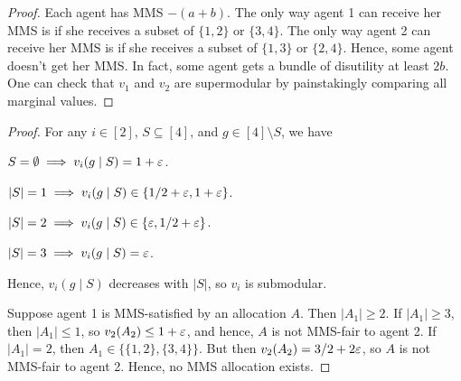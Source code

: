 \begin{proof}
Each agent has MMS $-(a+b)$.
The only way agent 1 can receive her MMS is if she receives a subset of $\{1, 2\}$ or $\{3, 4\}$.
The only way agent 2 can receive her MMS is if she receives a subset of $\{1, 3\}$ or $\{2, 4\}$.
Hence, some agent doesn't get her MMS. In fact, some agent gets a bundle of disutility at least $2b$.
One can check that $v_1$ and $v_2$ are supermodular by painstakingly comparing all marginal values.
\end{proof}

\begin{proof}
For any $i \in [2]$, $S \subseteq [4]$, and $g \in [4] \setminus S$, we have
\begin{tightenum}
\item $S = \emptyset \implies v_i(g \mid S) = 1 + \varepsilon$.
\item $|S| = 1 \implies v_i(g \mid S) \in \{1/2 + \varepsilon, 1 + \varepsilon\}$.
\item $|S| = 2 \implies v_i(g \mid S) \in \{\varepsilon, 1/2 + \varepsilon\}$.
\item $|S| = 3 \implies v_i(g \mid S) = \varepsilon$.
\end{tightenum}
Hence, $v_i(g \mid S)$ decreases with $|S|$, so $v_i$ is submodular.

Suppose agent 1 is MMS-satisfied by an allocation $A$. Then $|A_1| \ge 2$.
If $|A_1| \ge 3$, then $|A_1| \le 1$, so $v_2(A_2) \le 1 + \varepsilon$,
and hence, $A$ is not MMS-fair to agent 2.
If $|A_1| = 2$, then $A_1 \in \{\{1, 2\}, \{3, 4\}\}$.
But then $v_2(A_2) = 3/2 + 2\varepsilon$, so $A$ is not MMS-fair to agent 2.
Hence, no MMS allocation exists.
\end{proof}
